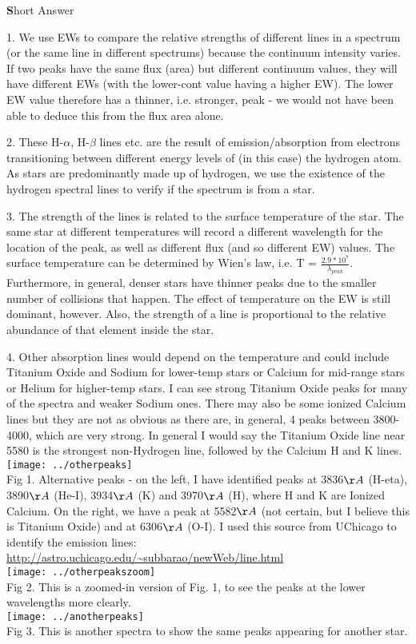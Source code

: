 \documentclass[12pt]{article}
\begin{document}
{\LARGE \textbf Short Answer}

1. We use EWs to compare the relative strengths of different lines in a spectrum (or the same line in different spectrums) because the continuum intensity varies. If two peaks have the same flux (area) but different continuum values, they will have different EWs (with the lower-cont value having a higher EW). The lower EW value therefore has a thinner, i.e. stronger, peak - we would not have been able to deduce this from the flux area alone.

2. These H-$\alpha$, H-$\beta$ lines etc. are the result of emission/absorption from electrons transitioning between different energy levels of (in this case) the hydrogen atom. As stars are predominantly made up of hydrogen, we use the existence of the hydrogen spectral lines to verify if the spectrum is from a star.

3. The strength of the lines is related to the surface temperature of the star. The same star at different temperatures will record a different wavelength for the location of the peak, as well as different flux (and so different EW) values. The surface temperature can be determined by Wien's law, i.e.
T = $ \frac{2.9*10^7}{\lambda_{peak}} $. Furthermore, in general, denser stars have thinner peaks due to the smaller number of collisions that happen. The effect of temperature on the EW is still dominant, however. Also, the strength of a line is proportional to the relative abundance of that element inside the star.

4. Other absorption lines would depend on the temperature and could include Titanium Oxide and Sodium for lower-temp stars or Calcium for mid-range stars or Helium for higher-temp stars. I can see strong Titanium Oxide peaks for many of the spectra and weaker Sodium ones. There may also be some ionized Calcium lines but they are not as obvious as there are, in general, 4 peaks between 3800-4000, which are very strong. In general I would say the Titanium Oxide line near 5580 is the strongest non-Hydrogen line, followed by the Calcium H and K lines.\\
\texttt{[image: ../otherpeaks]}\\
Fig 1. Alternative peaks - on the left, I have identified peaks at 3836$\AA$ (H-eta), 3890$\AA$ (He-I), 3934$\AA$ (K) and 3970$\AA$ (H), where H and K are Ionized Calcium.   On the right, we have a peak at 5582$\AA$ (not certain, but I believe this is Titanium Oxide) and at 6306$\AA$ (O-I). I used this source from UChicago to identify the emission lines: \url{http://astro.uchicago.edu/~subbarao/newWeb/line.html}\\
\texttt{[image: ../otherpeakszoom]}\\
Fig 2. This is a zoomed-in version of Fig. 1, to see the peaks at the lower wavelengths more clearly.\\
\texttt{[image: ../anotherpeaks]}\\
Fig 3. This is another spectra to show the same peaks appearing for another star.\\
\end{document}
